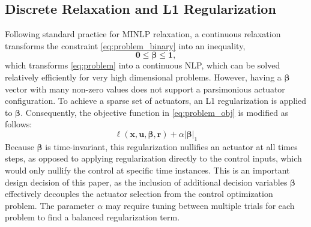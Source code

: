 \subsection{Discrete Relaxation and L1 Regularization}\label{sec:method:relaxation}
Following standard practice for MINLP relaxation, a continuous relaxation transforms the constraint \eqref{eq:problem_binary} into an inequality,
\begin{equation}
\textbf{0} \leq \boldsymbol{\beta} \leq \textbf{1},
\end{equation}
which transforms \eqref{eq:problem} into a continuous NLP, which can be solved relatively efficiently for very high dimensional problems. However, having a $\boldsymbol{\beta}$ vector with many non-zero values does not support a parsimonious actuator configuration. To achieve a sparse set of actuators, an L1 regularization is applied to $\boldsymbol{\beta}$. Consequently, the objective function in \eqref{eq:problem_obj} is modified as follows:
\begin{equation}
\ell(\textbf{x}, \textbf{u}, \boldsymbol{\beta} , \textbf{r}) + \alpha|\boldsymbol{\beta}|_1 \label{eq:obj_problem}
\end{equation}
Because $\boldsymbol{\beta}$ is time-invariant, this regularization nullifies an actuator at all times steps, as opposed to applying regularization directly to the control inputs, which would only nullify the control at specific time instances. This is an important design decision of this paper, as the inclusion of additional decision variables $\boldsymbol{\beta}$ effectively decouples the actuator selection from the control optimization problem. The parameter $\alpha$ may require tuning between multiple trials for each problem to find a balanced regularization term.
